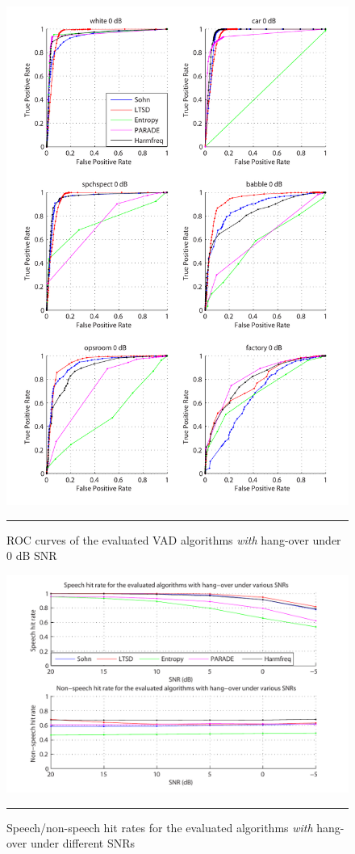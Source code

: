 \begin{figure}[htbp]
	\centering
		\includegraphics[width=1.0\columnwidth]{Figures/Chapter4/0dBh.pdf}
		\rule{37em}{0.5pt}
	\caption[ROC curves of the evaluated algorithms \emph{with} hang-over under 0 dB SNR]{ROC curves of the evaluated VAD algorithms \emph{with} hang-over under 0 dB SNR}
	\label{fig:0dBh}
\end{figure}

\begin{figure}[htbp]
	\centering
		\includegraphics[width=0.9\columnwidth]{Figures/Chapter4/snrh.pdf}
		\rule{37em}{0.5pt}
	\caption[Speech/non-speech hit rates for the evaluated algorithms \emph{with} hang-over under different SNRs]{Speech/non-speech hit rates for the evaluated algorithms \emph{with} hang-over under different SNRs}
	\label{fig:snrh}
\end{figure}

